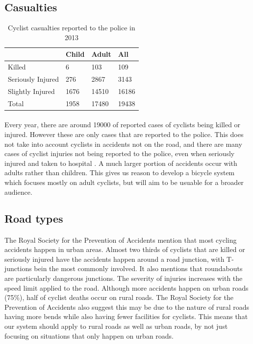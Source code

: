 \documentclass[a4paper]{report}
\begin{document}
{\subsection{Casualties}
\begin{table}[H]
\begin{tabular}{| l | l | l | l |}
\hline
 & \textbf{Child} & \textbf{Adult} & \textbf{All} \\ \hline
 Killed & 6 & 103 & 109 \\ \hline
 Seriously Injured & 276 & 2867 & 3143 \\ \hline
 Slightly Injured & 1676 & 14510 & 16186 \\ \hline
 Total & 1958 & 17480 & 19438 \\ \hline
\end{tabular}
\caption[Table caption text]{Cyclist casualties reported to the police in 2013 \citep{cycling_accidents}}
\label{table:casualties}
\end{table}

\paragraph{}Every year, there are around 19000 of reported cases of cyclists being killed or injured. However these are only cases that are reported to the police. This does not take into account cyclists in accidents not on the road, and there are many cases of cyclist injuries not being reported to the police, even when seriously injured and taken to hospital \citep{cycling_accidents}.
A much larger portion of accidents occur with adults rather than children. This gives us reason to develop a bicycle system which focuses mostly on adult cyclists, but will aim to be usuable for a broader audience. 
\subsection{Road types}
\paragraph{}The Royal Society for the Prevention of Accidents \cite{cycling_accidents} mention that most cycling accidents happen in urban areas. Almost two thirds of cyclists that are killed or seriously injured have the accidents happen around a road junction, with T-junctions bein the most commonly involved. It also mentions that roundabouts are particularly dangerous junctions. The severity of injuries increases with the speed limit applied to the road. Although more accidents happen on urban roads (75\%), half of cyclist deaths occur on rural roads. The Royal Society for the Prevention of Accidents \cite{rural_road_safety} also suggest this may be due to the nature of rural roads having more bends while also having fewer facilities for cyclists. This means that our system should apply to rural roads as well as urban roads, by not just focusing on situations that only happen on urban roads. 
}
\end{document}
